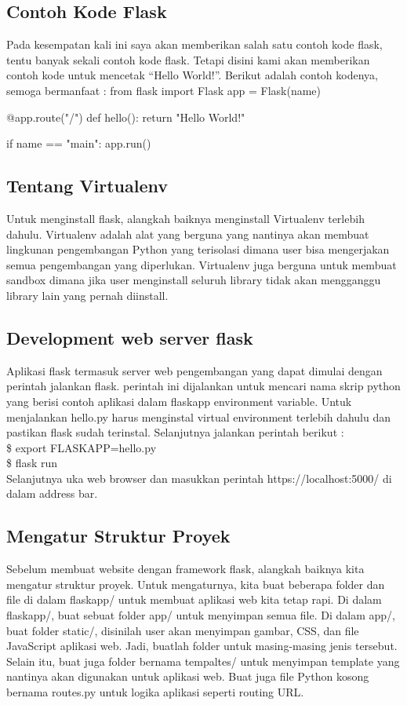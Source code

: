 \documentclass[12pt,a4paper]{article}
\begin{document}
\subsection{Contoh Kode Flask}
Pada kesempatan kali ini saya akan memberikan salah satu contoh kode flask, tentu banyak sekali contoh kode flask. Tetapi disini kami akan memberikan contoh kode untuk mencetak “Hello World!”. Berikut adalah contoh kodenya, semoga bermanfaat :
from flask import Flask
app = Flask(name)

@app.route("/")
def hello():
    return "Hello World!"

if name == "main":
    app.run()
\subsection{Tentang Virtualenv}
Untuk menginstall flask, alangkah baiknya menginstall Virtualenv terlebih dahulu. Virtualenv adalah alat yang berguna yang nantinya akan membuat lingkunan pengembangan Python yang terisolasi dimana user bisa mengerjakan semua pengembangan yang diperlukan. Virtualenv juga berguna untuk membuat sandbox dimana jika user menginstall seluruh library tidak akan mengganggu library lain yang pernah diinstall.
\subsection{Development web server flask}
Aplikasi flask termasuk server web pengembangan yang dapat dimulai dengan perintah jalankan flask. perintah ini dijalankan  untuk mencari nama skrip python yang berisi contoh aplikasi dalam flaskapp environment variable.
Untuk menjalankan hello.py harus menginstal virtual environment terlebih dahulu dan pastikan flask sudah terinstal. Selanjutnya jalankan perintah berikut :\\
\$ export FLASKAPP=hello.py\\
\$ flask run\\
Selanjutnya uka web browser dan masukkan perintah https://localhost:5000/ di dalam address bar.

\subsection{Mengatur Struktur Proyek}
Sebelum membuat website dengan framework flask, alangkah baiknya kita mengatur struktur proyek. Untuk mengaturnya, kita buat beberapa folder dan file di dalam flaskapp/ untuk membuat aplikasi web kita tetap rapi. Di dalam flaskapp/, buat sebuat folder app/ untuk menyimpan semua file. Di dalam app/, buat folder static/, disinilah user akan menyimpan gambar, CSS, dan file JavaScript aplikasi web. Jadi, buatlah folder untuk masing-masing jenis tersebut. Selain itu, buat juga folder bernama tempaltes/ untuk menyimpan template yang nantinya akan digunakan untuk aplikasi web. Buat juga file Python kosong bernama routes.py untuk logika aplikasi seperti routing URL.
\end{document}
